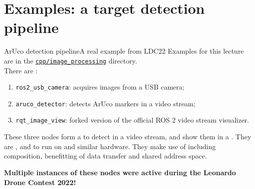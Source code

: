 
\section{Examples: a target detection pipeline}
\graphicspath{{figs/section4/}}

\begin{frame}{ArUco detection pipeline}{A real example from LDC22}
  Examples for this lecture are in the \href{https://github.com/IntelligentSystemsLabUTV/ros2-examples/tree/humble/src/cpp/image_processing}{\color{blue}\underline{\texttt{cpp/image\_processing}}} directory.\\
  There are :
  \begin{enumerate}
    \item \texttt{ros2\_usb\_camera}: acquires images from a USB camera;
    \item \texttt{aruco\_detector}: detects ArUco markers in a video stream;
    \item \texttt{rqt\_image\_view}: forked version of the official ROS 2 video stream visualizer.
  \end{enumerate}
  These three nodes form a  to detect  in a video stream, and show them in a . They are , and  to run on  and similar hardware. They make use of  including composition, benefitting of  data transfer and shared address space.
  \begin{block}{}
    \centering
    \textbf{Multiple instances of these nodes were active during the Leonardo Drone Contest 2022!}
  \end{block}
\end{frame}
